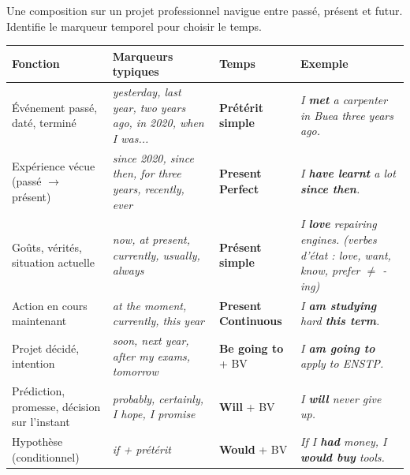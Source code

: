 \documentclass[11pt]{article}
\newcommand{\eng}[1]{\ifmmode\text{\textit{#1}}\else\begingroup\selectlanguage{english}\itshape #1\endgroup\fi}
\begin{document}
\begin{methode}
Une composition sur un projet professionnel navigue entre passé, présent et futur. Identifie le marqueur temporel pour choisir le temps.

\begin{center}
\begin{tabular}{|l|l|l|l|}
\hline
\rowcolor{popgreenL} \textbf{Fonction} & \textbf{Marqueurs typiques} & \textbf{Temps} & \textbf{Exemple} \\
\hline
Événement passé, daté, terminé & \eng{yesterday, last year, two years ago, in 2020, when I was...} & \textbf{Prétérit simple} & \eng{I \textbf{met} a carpenter in Buea three years ago.} \\
\hline
Expérience vécue (passé $\rightarrow$ présent) & \eng{since 2020, since then, for three years, recently, ever} & \textbf{Present Perfect} & \eng{I \textbf{have learnt} a lot \textbf{since then}.} \\
\hline
Goûts, vérités, situation actuelle & \eng{now, at present, currently, usually, always} & \textbf{Présent simple} & \eng{I \textbf{love} repairing engines.} (verbes d'état : \eng{love, want, know, prefer} $\neq$ \emph{-ing}) \\
\hline
Action en cours maintenant & \eng{at the moment, currently, this year} & \textbf{Present Continuous} & \eng{I \textbf{am studying} hard \textbf{this term}.} \\
\hline
Projet décidé, intention & \eng{soon, next year, after my exams, tomorrow} & \textbf{Be going to} + BV & \eng{I \textbf{am going to} apply to ENSTP.} \\
\hline
Prédiction, promesse, décision sur l'instant & \eng{probably, certainly, I hope, I promise} & \textbf{Will} + BV & \eng{I \textbf{will} never give up.} \\
\hline
Hypothèse (conditionnel) & \eng{if + prétérit} & \textbf{Would} + BV & \eng{If I \textbf{had} money, I \textbf{would buy} tools.} \\
\hline
\end{tabular}
\end{center}

\end{methode}
\end{document}
